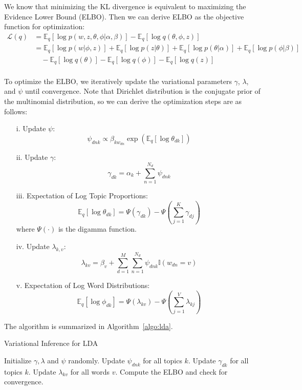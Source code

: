 \documentclass{article}
\begin{document}
\noindent We know that minimizing the KL divergence is equivalent to maximizing the Evidence Lower Bound (ELBO). Then we can derive ELBO as the objective function for optimization:
\begin{equation*}
    \begin{split}
        \mathcal{L}(q)&=\mathbb{E}_q[\log p(w,z,\theta,\phi|\alpha,\beta)]-\mathbb{E}_q[\log q(\theta,\phi,z)]\\
        &=\mathbb{E}_q[\log p(w|\phi,z)]+\mathbb{E}_q[\log p(z|\theta)]+\mathbb{E}_q[\log p(\theta|\alpha)]+\mathbb{E}_q[\log p(\phi|\beta)]\\&\quad-\mathbb{E}_q[\log q(\theta)]-\mathbb{E}_q[\log q(\phi)]-\mathbb{E}_q[\log q(z)]
    \end{split}
\end{equation*}\\

\noindent To optimize the ELBO, we iteratively update the variational parameters $\gamma$, $\lambda$, and $\psi$ until convergence. Note that Dirichlet distribution is the conjugate prior of the multinomial distribution, so we can derive the optimization steps are as follows:
\begin{enumerate}
    \item[i.] Update $\psi$: \[
        \psi_{dnk} \propto \beta_{kw_{dn}} \exp\left( \mathbb{E}_{q}[\log \theta_{dk}] \right)
        \]
    \item[ii.] Update $\gamma$:  \[
        \gamma_{dk} = \alpha_k + \sum_{n=1}^{N_d} \psi_{dnk}
        \]
    \item[iii.] Expectation of Log Topic Proportions:
        \[
        \mathbb{E}_{q}[\log \theta_{dk}] = \Psi(\gamma_{dk}) - \Psi\left( \sum_{j=1}^{K} \gamma_{dj} \right)
    \]
    \noindent where $\Psi(\cdot)$ is the digamma function.
    \item[iv.] Update $\lambda_{k,v}$:
        \[
        \lambda_{kv} = \beta_{v} + \sum_{d=1}^{M} \sum_{n=1}^{N_d} \psi_{dnk} \mathbb{I}(w_{dn}=v)
        \]
    \item[v.] Expectation of Log Word Distributions:
        \[
        \mathbb{E}_{q}[\log \phi_{dk}] = \Psi(\lambda_{kv}) - \Psi\left( \sum_{j=1}^{V} \lambda_{kj} \right)\]
\end{enumerate}

\noindent The algorithm is summarized in Algorithm~\ref{algo:lda}.
\begin{algorithm}
\caption{Variational Inference for LDA}
\begin{algorithmic}[1]\label{algo:lda}
\STATE Initialize $\gamma,\lambda$ and $\psi$ randomly.
\REPEAT
            \STATE Update $\psi_{dnk}$ for all topics $k$.
        \ENDFOR
        \STATE Update $\gamma_{dk}$ for all topics $k$.
    \ENDFOR
        \STATE Update $\lambda_{kv}$ for all words $v$.
    \ENDFOR
    \STATE Compute the ELBO and check for convergence.
\end{algorithmic}
\end{algorithm}
\end{document}
